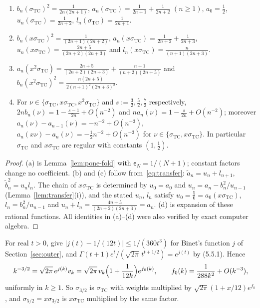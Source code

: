 \begin{lemma}\label{lem:pone-tc}
\begin{enumerate}
\item[(a)] $b_n(\sigma_{\mathrm{TC}})^2=\frac1{2n(2n+1)}$, $a_n(\sigma_{\mathrm{TC}})=\frac1{2n+1}+\frac1{2n+2}$ $(n\ge1)$,
  $a_0=\frac12$, $u_n(\sigma_{\mathrm{TC}})=\frac1{2n+2}$, $l_n(\sigma_{\mathrm{TC}})=\frac1{2n+1}$.
\item[(b)] $b_n(x\sigma_{\mathrm{TC}})^2=\frac1{(2n+1)(2n+2)}$, $a_n(x\sigma_{\mathrm{TC}})=\frac1{2n+2}+\frac1{2n+3}$,
  $u_n(x\sigma_{\mathrm{TC}})=\frac{2n+5}{(2n+2)(2n+3)}$ and $l_n(x\sigma_{\mathrm{TC}})=\frac n{(n+1)(2n+3)}$.
\item[(c)] $a_n(x^2\sigma_{\mathrm{TC}})=\frac{2n+5}{(2n+2)(2n+3)}+\frac{n+1}{(n+2)(2n+5)}$ and
  $b_n(x^2\sigma_{\mathrm{TC}})^2=\frac{n(2n+5)}{2(n+1)^2(2n+3)^2}$.
\item[(d)] For $\nu\in\{\sigma_{\mathrm{TC}},x\sigma_{\mathrm{TC}},x^2\sigma_{\mathrm{TC}}\}$ and $s:=\frac32,\frac52,\frac72$
  respectively, $2nb_n(\nu)=1-\frac{s-1}{2n}+O(n^{-2})$ and $na_n(\nu)=1-\frac s{2n}+O(n^{-2})$; moreover
  $a_n(\nu)-a_{n-1}(\nu)=-n^{-2}+O(n^{-3})$, $a_n(x\nu)-a_n(\nu)=-\frac12n^{-2}+O(n^{-3})$ for
  $\nu\in\{\sigma_{\mathrm{TC}},x\sigma_{\mathrm{TC}}\}$. In particular $\sigma_{\mathrm{TC}}$ and $x\sigma_{\mathrm{TC}}$ are
  regular with constants $(1,\frac12)$.
\end{enumerate}
\end{lemma}

\begin{proof}
(a) is Lemma~\ref{lem:pone-fold} with $\mathsf e_N=1/(N+1)$; constant factors change no coefficient. (b) and (c) follow
from~\eqref{eq:transfer}: $\tilde a_n=u_n+l_{n+1}$, $\tilde b_n^2=u_nl_n$. The chain of $x\sigma_{\mathrm{TC}}$ is
determined by $u_0=a_0$ and $u_n=a_n-b_n^2/u_{n-1}$ (Lemma~\ref{lem:transfer}(i)), and the stated $u_n$, $l_n$ satisfy
$u_0=\frac56=a_0(x\sigma_{\mathrm{TC}})$, $l_n=b_n^2/u_{n-1}$ and $u_n+l_n=\frac{4n+5}{(2n+2)(2n+3)}=a_n$. (d) is expansion
of these rational functions. All identities in (a)--(d) were also verified by exact computer algebra.
\end{proof}

For real $t>0$, \cite[(5.11.1) and \S5.11(ii)]{DLMF} give $|j(t)-1/(12t)|\le1/(360t^3)$ for Binet's function $j$ of
Section~\ref{sec:outer}, and $\Gamma(t+1)e^t/(\sqrt{2\pi}\,t^{t+1/2})=e^{j(t)}$ by (5.5.1). Hence
\begin{equation}\label{eq:pone-weight}
  k^{-3/2}=\sqrt{2\pi}\,e^{j(k)}v_k=\sqrt{2\pi}\,v_k\Bigl(1+\frac1{12k}\Bigr)e^{f_0(k)},\qquad
  f_0(k)=\frac1{288k^2}+O(k^{-3}),
\end{equation}
uniformly in $k\ge1$. So $\sigma_{3/2}$ is $\sigma_{\mathrm{TC}}$ with weights multiplied by $\sqrt{2\pi}(1+x/12)e^{f_0}$, and
$\sigma_{5/2}=x\sigma_{3/2}$ is $x\sigma_{\mathrm{TC}}$ multiplied by the same factor.


